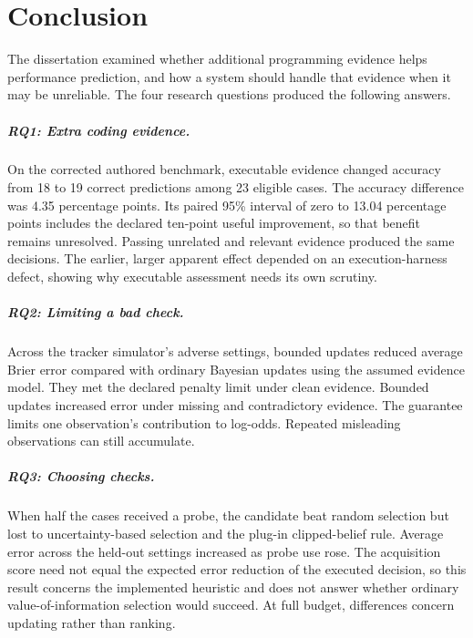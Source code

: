 \chapter{Conclusion}
\label{ch:conclusion}

The dissertation examined whether additional programming evidence helps performance prediction, and how a system should handle
that evidence when it may be unreliable. The four research questions produced the following answers.

\paragraph{RQ1: Extra coding evidence.}
On the corrected authored benchmark, executable evidence changed accuracy from 18 to 19 correct predictions among 23 eligible
cases. The accuracy difference was 4.35 percentage points. Its paired 95\% interval of zero to 13.04 percentage points includes the declared ten-point useful improvement, so that benefit
remains unresolved. Passing unrelated and relevant evidence produced the same decisions. The earlier, larger apparent effect
depended on an execution-harness defect, showing why executable assessment needs its own scrutiny.

\paragraph{RQ2: Limiting a bad check.}
Across the tracker simulator's adverse settings, bounded updates reduced average Brier error compared with ordinary Bayesian updates using the assumed evidence model. They met the
declared penalty limit under clean evidence. Bounded updates increased error under missing and contradictory evidence. The guarantee limits one
observation's contribution to log-odds. Repeated misleading observations can still accumulate.

\paragraph{RQ3: Choosing checks.}
When half the cases received a probe, the candidate beat random selection but lost to uncertainty-based selection and the plug-in
clipped-belief rule. Average error across the held-out settings increased as probe use rose. The acquisition score need not equal
the expected error reduction of the executed decision, so this result concerns the implemented heuristic and does not answer
whether ordinary value-of-information selection would succeed. At full budget, differences concern updating rather than ranking.

